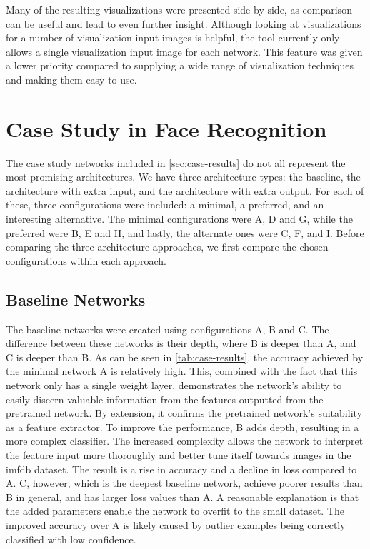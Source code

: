\noindent Many of the resulting visualizations were presented side-by-side, as comparison can be useful and lead to even further insight. Although looking at visualizations for a number of visualization input images is helpful, the tool currently only allows a single visualization input image for each network. This feature was given a lower priority compared to supplying a wide range of visualization techniques and making them easy to use.\\

\section{Case Study in Face Recognition}

The case study networks included in \autoref{sec:case-results} do not all represent the most promising architectures. We have three architecture types: the baseline, the architecture with extra input, and the architecture with extra output. For each of these, three configurations were included: a minimal, a preferred, and an interesting alternative. The minimal configurations were A, D and G, while the preferred were B, E and H, and lastly, the alternate ones were C, F, and I. Before comparing the three architecture approaches, we first compare the chosen configurations within each approach.

\subsection{Baseline Networks}

The baseline networks were created using configurations A, B and C. The difference between these networks is their depth, where B is deeper than A, and C is deeper than B. As can be seen in \autoref{tab:case-results}, the accuracy achieved by the minimal network A is relatively high. This, combined with the fact that this network only has a single weight layer, demonstrates the network's ability to easily discern valuable information from the features outputted from the pretrained network. By extension, it confirms the pretrained network's suitability as a feature extractor. To improve the performance, B adds depth, resulting in a more complex classifier. The increased complexity allows the network to interpret the feature input more thoroughly and better tune itself towards images in the \acrshort{imfdb} dataset. The result is a rise in accuracy and a decline in loss compared to A. C, however, which is the deepest baseline network, achieve poorer results than B in general, and has larger loss values than A. A reasonable explanation is that the added parameters enable the network to overfit to the small dataset. The improved accuracy over A is likely caused by outlier examples being correctly classified with low confidence.

